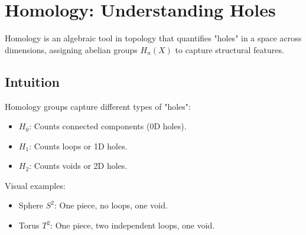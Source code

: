\section{Homology: Understanding Holes}

Homology is an algebraic tool in topology that quantifies "holes" in a space across dimensions, assigning abelian groups $H_n(X)$ to capture structural features.

\subsection{Intuition}

\begin{proposition}
Homology groups capture different types of "holes":
\begin{itemize}
    \item $H_0$: Counts connected components (0D holes).
    \item $H_1$: Counts loops or 1D holes.
    \item $H_2$: Counts voids or 2D holes.
\end{itemize}
\end{proposition}

\begin{example}
Visual examples:
\begin{itemize}
    \item Sphere $S^2$: One piece, no loops, one void.
    \item Torus $T^2$: One piece, two independent loops, one void.
\end{itemize}
\end{example}

